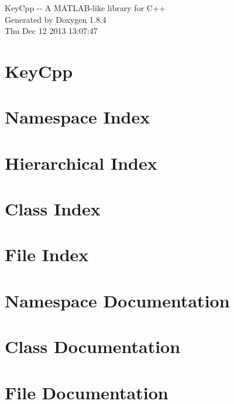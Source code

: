 \documentclass[twoside]{book}
\newcommand{\clearemptydoublepage}{%
  \newpage{\pagestyle{empty}\cleardoublepage}%
}
\begin{document}
\hypersetup{pageanchor=false}
\begin{titlepage}
\vspace*{7cm}
\begin{center}%
{\Large Key\-Cpp -\/-\/ A M\-A\-T\-L\-A\-B-\/like library for C++ }\\
\vspace*{1cm}
{\large Generated by Doxygen 1.8.4}\\
\vspace*{0.5cm}
{\small Thu Dec 12 2013 13:07:47}\\
\end{center}
\end{titlepage}
\clearemptydoublepage
\tableofcontents
\clearemptydoublepage
{}
\hypersetup{pageanchor=true}

\chapter{Key\-Cpp}
\label{index}\hypertarget{index}{}
\chapter{Namespace Index}

\chapter{Hierarchical Index}

\chapter{Class Index}

\chapter{File Index}

\chapter{Namespace Documentation}

\chapter{Class Documentation}
























\chapter{File Documentation}


\newpage
{}
{}
\printindex
\end{document}
